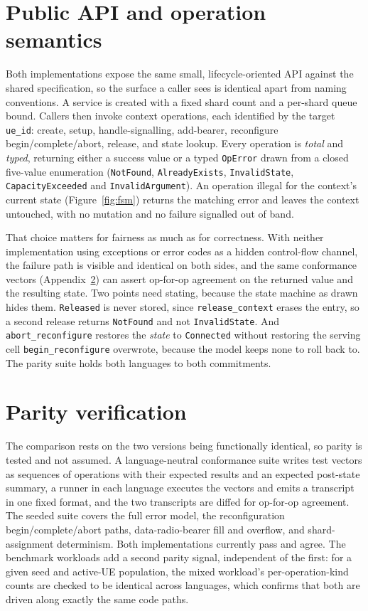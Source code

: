 \documentclass[english,oneside,a4paper,censored,csm,software-track-2020]{HYthesisML}
\begin{document}
\begin{appendices}
\section{Public API and operation semantics}
Both implementations expose the same small, lifecycle-oriented API against the shared
specification, so the surface a caller sees is identical apart from naming conventions. A service
is created with a fixed shard count and a per-shard queue bound. Callers then invoke context
operations, each identified by the target \texttt{ue\_id}: create, setup, handle-signalling,
add-bearer, reconfigure begin/complete/abort, release, and state lookup. Every operation is
\emph{total} and \emph{typed}, returning either a success value or a typed \texttt{OpError} drawn
from a closed five-value enumeration (\texttt{NotFound}, \texttt{AlreadyExists},
\texttt{InvalidState}, \texttt{CapacityExceeded} and \texttt{InvalidArgument}). An operation
illegal for the context's current state (Figure~\ref{fig:fsm}) returns the matching error and
leaves the context untouched, with no mutation and no failure signalled out of band.

That choice matters for fairness as much as for correctness. With neither implementation using
exceptions or error codes as a hidden control-flow channel, the failure path is visible and
identical on both sides, and the same conformance vectors (Appendix~\ref{sec:parity}) can assert
op-for-op agreement on the returned value and the resulting state. Two points need stating,
because the state machine as drawn hides them. \texttt{Released} is never stored, since
\texttt{release\_context} erases the entry, so a second release returns \texttt{NotFound} and not
\texttt{InvalidState}. And \texttt{abort\_reconfigure} restores the \emph{state} to
\texttt{Connected} without restoring the serving cell \texttt{begin\_reconfigure} overwrote,
because the model keeps none to roll back to. The parity suite holds both languages to both
commitments.

\section{Parity verification}
\label{sec:parity}
The comparison rests on the two versions being functionally identical, so parity is tested and not
assumed. A language-neutral conformance suite writes test vectors as sequences of operations with
their expected results and an expected post-state summary, a runner in each language executes the
vectors and emits a transcript in one fixed format, and the two transcripts are diffed for
op-for-op agreement. The seeded suite covers the full error model, the reconfiguration
begin/complete/abort paths, data-radio-bearer fill and overflow, and shard-assignment
determinism. Both implementations currently pass and agree. The benchmark workloads add a second
parity signal, independent of the first: for a given seed and active-UE population, the mixed
workload's per-operation-kind counts are checked to be identical across languages, which confirms
that both are driven along exactly the same code paths.


\end{appendices}
\end{document}
